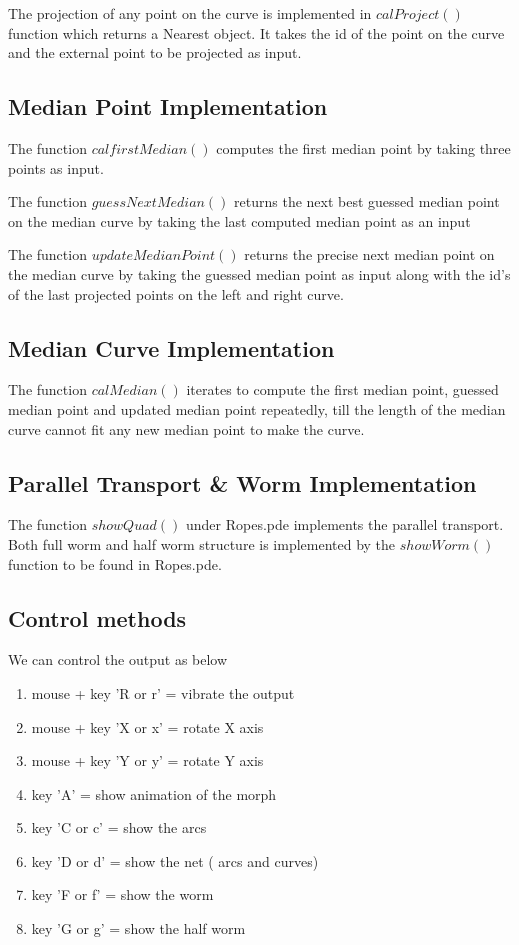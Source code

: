 \documentclass[twoside,11pt]{article}
\begin{document}
The projection of any point on the curve is implemented in $calProject()$ function which returns a Nearest object. It takes the id of the point on the curve and the external point to be projected as input.

\subsection{Median Point Implementation}
The function $calfirstMedian()$ computes the first median point by taking three points as input.

The function $guessNextMedian()$ returns the next best guessed median point on the median curve by taking the last computed median point as an input

The function $updateMedianPoint()$ returns the precise next median point on the median curve by taking the guessed median point as input along with the id's of the last projected points on the left and right curve.


\subsection{Median Curve Implementation}

The function $calMedian()$ iterates to compute the first median point, guessed median point and updated median point repeatedly, till the length of the median curve cannot fit any new median point to make the curve.

\subsection{Parallel Transport & Worm Implementation}

The function $showQuad()$ under Ropes.pde implements the parallel transport. Both full worm and half worm structure is implemented by the $showWorm()$ function to be found in Ropes.pde.

\subsection{Control methods}
We can control the output as below \begin{enumerate}
 \item mouse + key 'R or r' = vibrate the output
 \item mouse + key 'X or x' = rotate X axis
 \item mouse + key 'Y or y' = rotate Y axis
\item key 'A' = show animation of the morph
\item key 'C or c' = show the arcs
\item key 'D or d' = show the net ( arcs and curves)
\item key 'F or f' = show the worm
\item key 'G or g' = show the half worm

 \end{enumerate}
 
\end{document}

